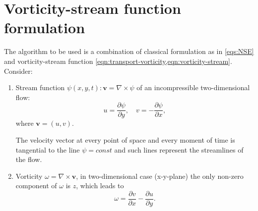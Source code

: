 \documentclass{article}
\numberwithin{equation}{section}
\begin{document}
\pagebreak
\section{Vorticity-stream function formulation}\label{sec:vorticity-streamfunction}
	The algorithm to be used is a combination of classical formulation as in \cref{eqs:NSE} and vorticity-stream function \cref{eqn:transport-vorticity,eqn:vorticity-stream}.
	Consider:
	
	\begin{enumerate}
	\item	

	Stream function $\psi(x,y,t):\boldsymbol{v}=\nabla \times \psi$ of an incompressible two-dimensional flow:
	\begin{equation}
	\label{eqn:streamfunction}
		u = \frac{\partial \psi}{\partial y},\quad v=-\frac{\partial \psi}{\partial x},
	\end{equation}
	where $\boldsymbol{v}=(u,v)$.
	
	The velocity vector at every point of space and every moment of time is tangential to the line $\psi = const$ and such lines represent the streamlines of the flow. 
	\item
	
	Vorticity $\omega = \nabla \times \boldsymbol{v}$, in two-dimensional case (x-y-plane) the only non-zero component of $\omega$ is $z$, which leads to
	\begin{equation}
	\label{eqn:vorticity}
		\omega=\frac{\partial v}{\partial x} - \frac{\partial u}{\partial y}.
	\end{equation}
	\end{enumerate}
	
\end{document}
